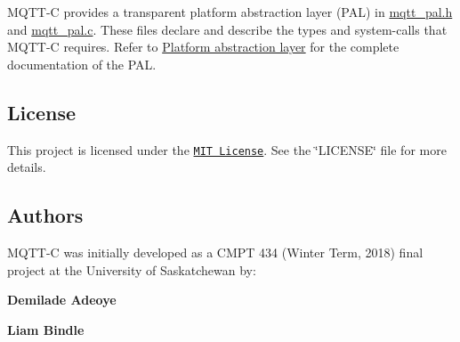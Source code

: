 M\+Q\+T\+T-\/C provides a transparent platform abstraction layer (P\+AL) in {\ttfamily \hyperlink{mqtt__pal_8h}{mqtt\+\_\+pal.\+h}} and {\ttfamily \hyperlink{mqtt__pal_8c}{mqtt\+\_\+pal.\+c}}. These files declare and describe the types and system-\/calls that M\+Q\+T\+T-\/C requires. Refer to \hyperlink{group__pal}{Platform abstraction layer} for the complete documentation of the P\+AL.

\subsection*{License}

This project is licensed under the \href{https://opensource.org/licenses/MIT}{\tt M\+IT License}. See the {\ttfamily \char`\"{}\+L\+I\+C\+E\+N\+S\+E\char`\"{}} file for more details.

\subsection*{Authors}

M\+Q\+T\+T-\/C was initially developed as a C\+M\+PT 434 (Winter Term, 2018) final project at the University of Saskatchewan by\+:
\begin{DoxyItemize}
\item {\bfseries Demilade Adeoye}
\item {\bfseries Liam Bindle} 
\end{DoxyItemize}